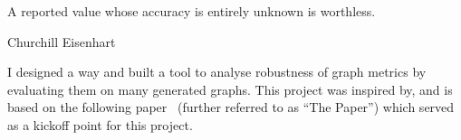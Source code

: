 \epigraph{A reported value whose accuracy is entirely unknown is worthless.}{Churchill Eisenhart~\cite{EisenhartExpressionUncertaintiesFinal1968}}

%
%


I designed a way and built a tool to analyse robustness of graph metrics by evaluating them on many generated graphs.
This project was inspired by, and is based on the following paper~\cite{Bozhilova2019} (further referred to as ``The Paper'') which served as a kickoff point for this project.
\begin{adjustwidth}{1cm}{}
    \vspace*{0.5em}\vspace*{0.5em}
\end{adjustwidth}

